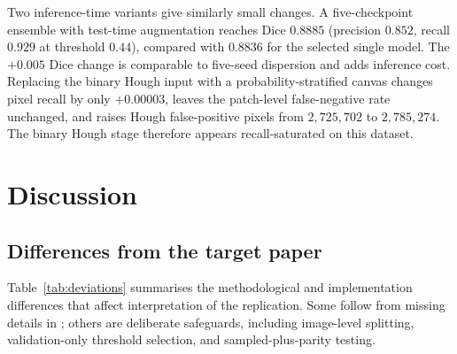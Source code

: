\documentclass{cam-thesis}
\begin{document}
Two inference-time variants give similarly small changes. A five-checkpoint
ensemble with test-time augmentation reaches Dice $0.8885$ (precision $0.852$,
recall $0.929$ at threshold $0.44$), compared with $0.8836$ for the selected
single model. The $+0.005$ Dice change is comparable to five-seed dispersion and
adds inference cost. Replacing the binary Hough input with a probability-stratified
canvas changes pixel recall by only $+0.00003$, leaves the patch-level
false-negative rate unchanged, and raises Hough false-positive pixels from
$2{,}725{,}702$ to $2{,}785{,}274$. The binary Hough stage therefore appears
recall-saturated on this dataset.

\chapter{Discussion}
\label{ch:discussion}

\section{Differences from the target paper}
\label{sec:deviations}

Table~\ref{tab:deviations} summarises the methodological and implementation
differences that affect interpretation of the replication. Some follow from
missing details in \citet{stoppa2024}; others are deliberate safeguards,
including image-level splitting, validation-only threshold selection, and
sampled-plus-parity testing.
\end{document}
